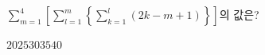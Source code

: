 \hspace*{2mm}\begin{minipage}[t]{\dimexpr\linewidth-2mm\relax}\vspace{0pt}
$\displaystyle\sum_{m=1}^{4}\left[\sum_{l=1}^{m}\left\{\sum_{k=1}^{l}(2k-m+1)\right\}\right]$의 값은?
\begin{choices32}{$20$}{$25$}{$30$}{$35$}{$40$}\end{choices32}\end{minipage}
